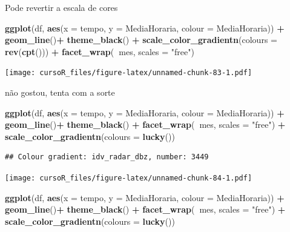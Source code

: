 \documentclass[]{book}
\newenvironment{Shaded}{\begin{snugshade}}{\end{snugshade}}
\newcommand{\KeywordTok}[1]{\textcolor[rgb]{0.13,0.29,0.53}{\textbf{#1}}}
\newcommand{\DataTypeTok}[1]{\textcolor[rgb]{0.13,0.29,0.53}{#1}}
\newcommand{\StringTok}[1]{\textcolor[rgb]{0.31,0.60,0.02}{#1}}
\newcommand{\OperatorTok}[1]{\textcolor[rgb]{0.81,0.36,0.00}{\textbf{#1}}}
\newcommand{\NormalTok}[1]{#1}
\begin{document}
Pode revertir a escala de cores

\begin{Shaded}
\begin{Highlighting}[]
\KeywordTok{ggplot}\NormalTok{(df, }\KeywordTok{aes}\NormalTok{(}\DataTypeTok{x =}\NormalTok{ tempo, }\DataTypeTok{y =}\NormalTok{ MediaHoraria, }\DataTypeTok{colour =}\NormalTok{ MediaHoraria)) }\OperatorTok{+}\StringTok{ }
\StringTok{  }\KeywordTok{geom_line}\NormalTok{()}\OperatorTok{+}
\StringTok{  }\KeywordTok{theme_black}\NormalTok{() }\OperatorTok{+}
\StringTok{  }\KeywordTok{scale_color_gradientn}\NormalTok{(}\DataTypeTok{colours =} \KeywordTok{rev}\NormalTok{(}\KeywordTok{cpt}\NormalTok{())) }\OperatorTok{+}\StringTok{ }
\StringTok{  }\KeywordTok{facet_wrap}\NormalTok{(}\OperatorTok{~}\NormalTok{mes, }\DataTypeTok{scales =} \StringTok{"free"}\NormalTok{)}
\end{Highlighting}
\end{Shaded}

\texttt{[image: cursoR\_files/figure-latex/unnamed-chunk-83-1.pdf]}

não gostou, tenta com a sorte

\begin{Shaded}
\begin{Highlighting}[]
\KeywordTok{ggplot}\NormalTok{(df, }\KeywordTok{aes}\NormalTok{(}\DataTypeTok{x =}\NormalTok{ tempo, }\DataTypeTok{y =}\NormalTok{ MediaHoraria, }\DataTypeTok{colour =}\NormalTok{ MediaHoraria)) }\OperatorTok{+}\StringTok{ }
\StringTok{  }\KeywordTok{geom_line}\NormalTok{()}\OperatorTok{+}
\StringTok{  }\KeywordTok{theme_black}\NormalTok{() }\OperatorTok{+}
\StringTok{    }\KeywordTok{facet_wrap}\NormalTok{(}\OperatorTok{~}\NormalTok{mes, }\DataTypeTok{scales =} \StringTok{"free"}\NormalTok{) }\OperatorTok{+}
\StringTok{  }\KeywordTok{scale_color_gradientn}\NormalTok{(}\DataTypeTok{colours =} \KeywordTok{lucky}\NormalTok{())}
\end{Highlighting}
\end{Shaded}

\begin{verbatim}
## Colour gradient: idv_radar_dbz, number: 3449
\end{verbatim}

\texttt{[image: cursoR\_files/figure-latex/unnamed-chunk-84-1.pdf]}

\begin{Shaded}
\begin{Highlighting}[]
\KeywordTok{ggplot}\NormalTok{(df, }\KeywordTok{aes}\NormalTok{(}\DataTypeTok{x =}\NormalTok{ tempo, }\DataTypeTok{y =}\NormalTok{ MediaHoraria, }\DataTypeTok{colour =}\NormalTok{ MediaHoraria)) }\OperatorTok{+}\StringTok{ }
\StringTok{  }\KeywordTok{geom_line}\NormalTok{()}\OperatorTok{+}
\StringTok{  }\KeywordTok{theme_black}\NormalTok{() }\OperatorTok{+}
\StringTok{    }\KeywordTok{facet_wrap}\NormalTok{(}\OperatorTok{~}\NormalTok{mes, }\DataTypeTok{scales =} \StringTok{"free"}\NormalTok{) }\OperatorTok{+}
\StringTok{  }\KeywordTok{scale_color_gradientn}\NormalTok{(}\DataTypeTok{colours =} \KeywordTok{lucky}\NormalTok{())}
\end{Highlighting}
\end{Shaded}
\end{document}
